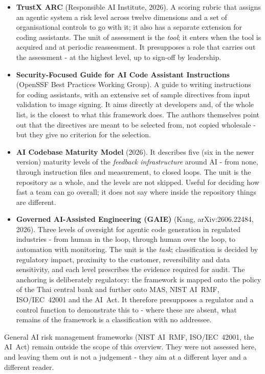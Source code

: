 \begin{itemize}
\item \textbf{TrustX ARC} (Responsible AI Institute, 2026).
A scoring rubric that assigns an agentic system a risk level across twelve dimensions and a set of organisational controls to go with it; it also has a separate extension for coding assistants.
The unit of assessment is the \emph{tool}; it enters when the tool is acquired and at periodic reassessment.
It presupposes a role that carries out the assessment - at the highest level, up to sign-off by leadership.

\item \textbf{Security-Focused Guide for AI Code Assistant Instructions} (OpenSSF Best Practices Working Group).
A guide to writing instructions for coding assistants, with an extensive set of sample directives from input validation to image signing.
It aims directly at developers and, of the whole list, is the closest to what this framework does.
The authors themselves point out that the directives are meant to be selected from, not copied wholesale - but they give no criterion for the selection.

\item \textbf{AI Codebase Maturity Model} (2026).
It describes five (six in the newer version) maturity levels of the \emph{feedback infrastructure} around AI - from none, through instruction files and measurement, to closed loops.
The unit is the repository as a whole, and the levels are not skipped.
Useful for deciding how fast a team can go overall; it does not say where inside the repository things are different.

\item \textbf{Governed AI-Assisted Engineering (GAIE)} (Kang, arXiv:2606.22484, 2026).
Three levels of oversight for agentic code generation in regulated industries - from human in the loop, through human over the loop, to automation with monitoring.
The unit is the \emph{task}; classification is decided by regulatory impact, proximity to the customer, reversibility and data sensitivity, and each level prescribes the evidence required for audit.
The anchoring is deliberately regulatory: the framework is mapped onto the policy of the Thai central bank and further onto MAS, NIST AI~RMF, ISO/IEC~42001 and the AI~Act.
It therefore presupposes a regulator and a control function to demonstrate this to - where these are absent, what remains of the framework is a classification with no addressee.
\end{itemize}

General AI risk management frameworks (NIST AI~RMF, ISO/IEC~42001, the AI~Act) remain outside the scope of this overview.
They were not assessed here, and leaving them out is not a judgement - they aim at a different layer and a different reader.

